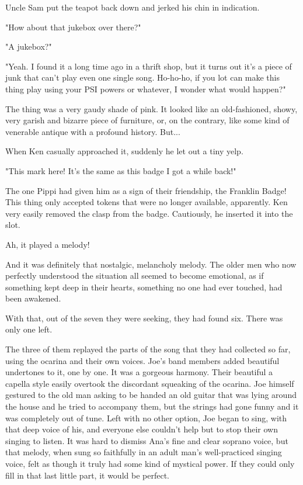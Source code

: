 \documentclass[
]{article}
\begin{document}
Uncle Sam put the teapot back down and jerked his chin in indication.

"How about that jukebox over there?"

"A jukebox?"

"Yeah. I found it a long time ago in a thrift shop, but it turns out
it's a piece of junk that can't play even one single song. Ho-ho-ho, if
you lot can make this thing play using your PSI powers or whatever, I
wonder what would happen?"

The thing was a very gaudy shade of pink. It looked like an
old-fashioned, showy, very garish and bizarre piece of furniture, or, on
the contrary, like some kind of venerable antique with a profound
history. But...

When Ken casually approached it, suddenly he let out a tiny yelp.

"This mark here! It's the same as this badge I got a while back!"

The one Pippi had given him as a sign of their friendship, the Franklin
Badge! This thing only accepted tokens that were no longer available,
apparently. Ken very easily removed the clasp from the badge.
Cautiously, he inserted it into the slot.

Ah, it played a melody!

And it was definitely that nostalgic, melancholy melody. The older men
who now perfectly understood the situation all seemed to become
emotional, as if something kept deep in their hearts, something no one
had ever touched, had been awakened.

With that, out of the seven they were seeking, they had found six. There
was only one left.

The three of them replayed the parts of the song that they had collected
so far, using the ocarina and their own voices. Joe's band members added
beautiful undertones to it, one by one. It was a gorgeous harmony. Their
beautiful a capella style easily overtook the discordant squeaking of
the ocarina. Joe himself gestured to the old man asking to be handed an
old guitar that was lying around the house and he tried to accompany
them, but the strings had gone funny and it was completely out of tune.
Left with no other option, Joe began to sing, with that deep voice of
his, and everyone else couldn't help but to stop their own singing to
listen. It was hard to dismiss Ana's fine and clear soprano voice, but
that melody, when sung so faithfully in an adult man's well-practiced
singing voice, felt as though it truly had some kind of mystical power.
If they could only fill in that last little part, it would be perfect.
\end{document}
